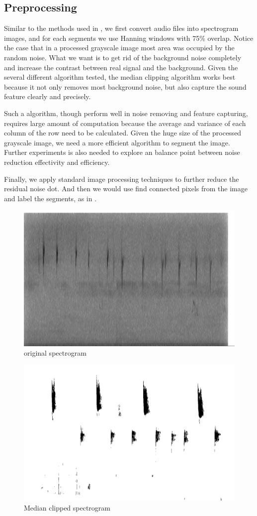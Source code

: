 \documentclass{article} %
\begin{document}
\subsection{Preprocessing}

Similar to the methods used in \cite{Lasseck13}, we first convert audio files into spectrogram images, and for each segments we use Hanning windows with 75\% overlap. Notice the case that in a processed grayscale image most area was occupied by the random noise. What we want is to get rid of the background noise completely and increase the contrast between real signal and the background. Given the several different algorithm tested, the median clipping algorithm \cite{mlsp1} works best because it not only removes most background noise, but also capture the sound feature clearly and precisely.

Such a algorithm, though perform well in noise removing and feature capturing, requires large amount of computation because the average and variance of each column of the row need to be calculated. Given the huge size of the processed grayscale image, we need a more efficient algorithm to segment the image. Further experiments is also needed to explore an balance point between noise reduction effectivity and efficiency.

Finally, we apply standard image processing techniques to further reduce the residual noise dot. And then we would use find connected pixels from the image and label the segments, as in \cite{Lasseck13}.

\begin{figure}[p]
    \centering
    \includegraphics[width=0.8\linewidth, height=0.3\linewidth]{../Figure/Cropped}
     \centering
    \caption{original spectrogram}
    \label{fig:original}
\end{figure}

\begin{figure}[p]
    \centering
    \includegraphics[width=0.8\linewidth, height=0.3\linewidth]{../Figure/Median_clipped}
     \centering
    \caption{Median clipped spectrogram}
    \label{fig:Median_clipped}
\end{figure}
\end{document}
